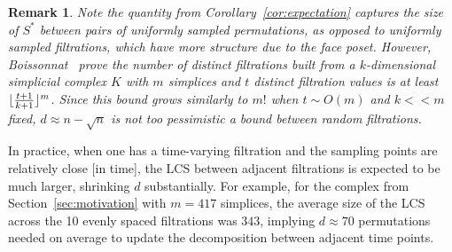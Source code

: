 \documentclass[sn-mathphys]{sn-jnl}
\newtheorem{remark}{Remark}
\DeclarePairedDelimiter\floor{\lfloor}{\rfloor}
\begin{document}
\begin{remark}
\noindent Note the quantity from Corollary~\ref{cor:expectation} captures the size of $S^\ast$ between pairs of uniformly sampled permutations, as opposed to uniformly sampled filtrations, which have more structure due to the face poset. 
However, Boissonnat~\cite{boissonnat2018efficient} prove the number of distinct filtrations built from a $k$-dimensional simplicial complex $K$ with $m$ simplices and $t$ distinct filtration values is \emph{at least} $\floor{\frac{t+1}{k+1}}^m$. 
Since this bound grows similarly to $m!$ when $t \sim O(m)$ and $k << m$ fixed, $d \approx n - \sqrt{n}$ is not too pessimistic a bound between random filtrations.     
\end{remark}
\noindent 
In practice, when one has a time-varying filtration and the sampling points are relatively close [in time], the LCS between adjacent filtrations is expected to be much larger, shrinking $d$ substantially. 
For example, for the complex from Section~\ref{sec:motivation} with $m=417$ simplices, the average size of the LCS across the 10 evenly spaced filtrations was $343$, implying $d \approx 70$ permutations needed on average to update the decomposition between adjacent time points.
 
\end{document}

